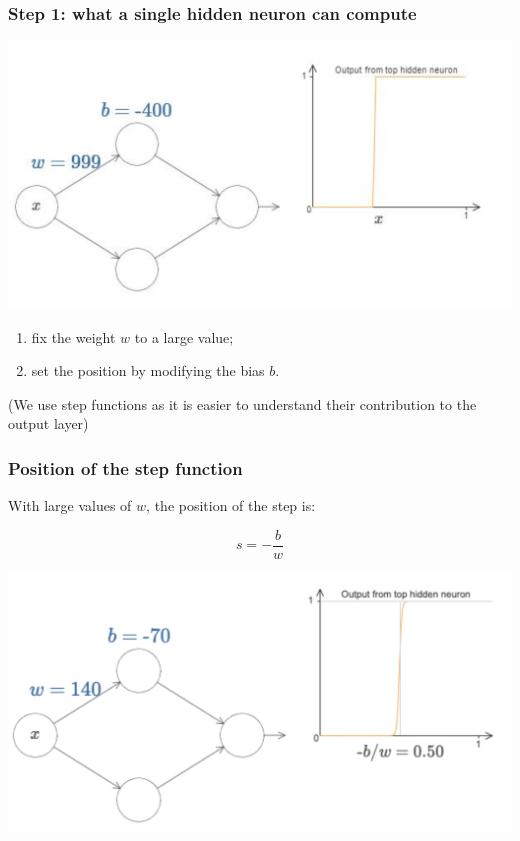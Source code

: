 \documentclass[usenames,dvipsnames]{beamer}
\begin{document}
\begin{frame}
  \frametitle{Step 1: what a single hidden neuron can compute}
  
  \begin{center}
  \includegraphics[scale=.3]{single-hid-neu}
  \end{center}
  
  \begin{enumerate}
  \item fix the weight $w$ to a large value;
  \item set the position by modifying the bias	 $b$.
  \end{enumerate}

  
  {\footnotesize (We use step functions as it is easier to understand their contribution to the output layer)}
  
\end{frame}

\begin{frame}
  \frametitle{Position of the step function}
  
  With large values of $w$, the position of the step is:
  
  \[s = - \frac{b}{w}\]
  
  \vfill
  
 \centering
\includegraphics[scale=.35]{step-pos}

\end{frame}
\end{document}
